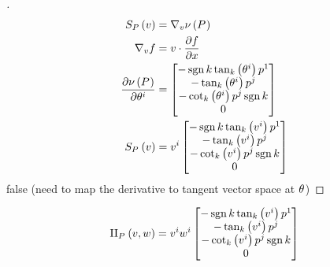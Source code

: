 \documentclass[stu, babel, american, biblatex, a4paper, draftall]{apa7}
\begin{document}
\begin{proof}[]
    \skipped

    \begin{align*}
        S_{P}\left(v\right)
                   & = \nabla_v \nu\left(\tensor{P}{}\right)     \\
        \nabla_v f & = v \cdot \frac{\partial f}{\partial x}     \\
        \frac{\partial\nu\left(\tensor{P}{}\right)}{\partial\tensor{\theta}{^i}}
                   & = \begin{bmatrix}
            -\sign{k}\tan_k\left(\tensor{\theta}{^i}\right)\tensor{p}{^1} \\
            -\tan_k\left(\tensor{\theta}{^i}\right)\tensor{p}{^j}         \\
            -\cot_k\left(\tensor{\theta}{^i}\right)\tensor{p}{^j}\sign{k} \\
            0                                                             \\
        \end{bmatrix}                \\
        S_{\tensor{P}{}}\left(v\right)
                   & = \tensor{v}{^i} \begin{bmatrix}
            -\sign{k}\tan_k\left(\tensor{v}{^i}\right)\tensor{p}{^1} \\
            -\tan_k\left(\tensor{v}{^i}\right)\tensor{p}{^j}         \\
            -\cot_k\left(\tensor{v}{^i}\right)\tensor{p}{^j}\sign{k} \\
            0                                                        \\
        \end{bmatrix}
    \end{align*}
    false (need to map the derivative to tangent vector space at $\tensor{\theta}{}$)
\end{proof}
\begin{lemma}\label{Model:SecondFundamental}
    \begin{equation*}
        \text{II}_{\tensor{P}{}}\left(v,w\right) = \tensor{v}{^i}\tensor{w}{^i} \begin{bmatrix}
            -\sign{k}\tan_k\left(\tensor{v}{^i}\right)\tensor{p}{^1} \\
            -\tan_k\left(\tensor{v}{^i}\right)\tensor{p}{^j}         \\
            -\cot_k\left(\tensor{v}{^i}\right)\tensor{p}{^j}\sign{k} \\
            0                                                        \\
        \end{bmatrix}
    \end{equation*}
\end{lemma}
\end{document}
